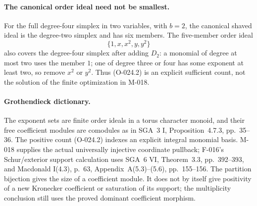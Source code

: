 \paragraph{The canonical order ideal need not be smallest.}
For the full degree-four simplex in two variables, with
$b=2$, the canonical shaved ideal is the degree-two
simplex and has six members. The five-member order ideal
\[
                     \{1,x,x^2,y,y^2\}
\]
also covers the degree-four simplex after adding $D_2$:
a monomial of degree at most two uses the member $1$;
one of degree three or four has some exponent at least
two, so remove $x^2$ or $y^2$.
Thus (O-024.2) is an explicit sufficient count, not
the solution of the finite optimization in M-018.

\paragraph{Grothendieck dictionary.}
The exponent sets are finite order ideals in a torus
character monoid, and their free coefficient modules
are comodules as in SGA~3 I, Proposition~4.7.3,
pp.~35--36. The positive count (O-024.2) indexes
an explicit integral monomial basis. M-018 supplies
the actual universally injective coordinate pullback;
F-016's Schur/exterior support calculation uses SGA~6
VI, Theorem~3.3, pp.~392--393, and Macdonald I(4.3),
p.~63, Appendix~A(5.3)--(5.6), pp.~155--156.
The partition bijection gives the size of a coefficient
module. It does not by itself give positivity of a new
Kronecker coefficient or saturation of its support;
the multiplicity conclusion still uses the proved
dominant coefficient morphism.

